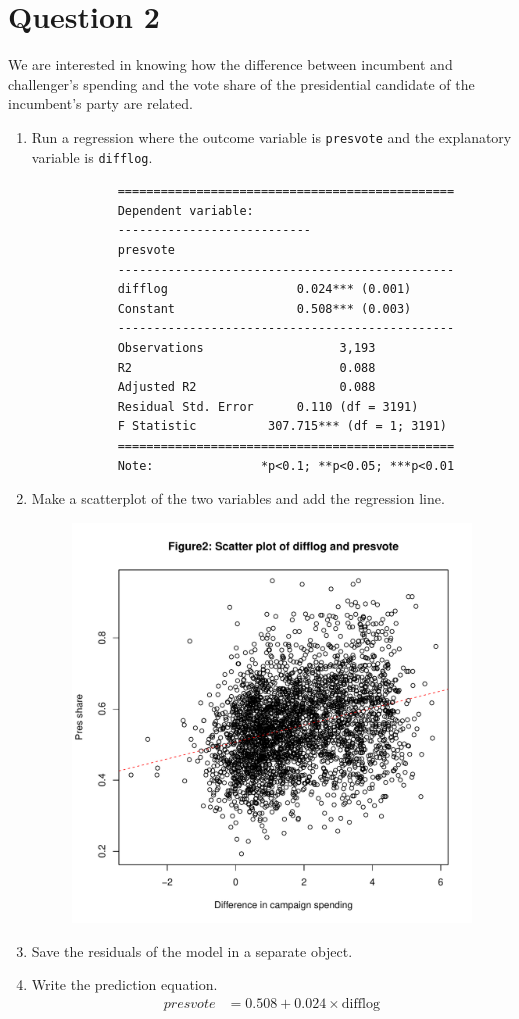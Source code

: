 \documentclass[12pt,letterpaper]{article}
\begin{document}
\section*{Question 2}
\noindent We are interested in knowing how the difference between incumbent and challenger's spending and the vote share of the presidential candidate of the incumbent's party are related.	\vspace{.25cm}
	\begin{enumerate}
		\item Run a regression where the outcome variable is \texttt{presvote} and the explanatory variable is \texttt{difflog}.
		 
		\begin{verbatim}
			===============================================
			Dependent variable:    
			---------------------------
			presvote          
			-----------------------------------------------
			difflog                  0.024*** (0.001)      
			Constant                 0.508*** (0.003)      
			-----------------------------------------------
			Observations                   3,193           
			R2                             0.088           
			Adjusted R2                    0.088           
			Residual Std. Error      0.110 (df = 3191)     
			F Statistic          307.715*** (df = 1; 3191) 
			===============================================
			Note:               *p<0.1; **p<0.05; ***p<0.01
		\end{verbatim} 
		
		\item Make a scatterplot of the two variables and add the regression line.
		 
		\begin{figure}[H]
			\centering
			\includegraphics[width=.55\textwidth]{Q2_2_scatterplot.pdf}
		\end{figure}
		
		\item Save the residuals of the model in a separate object.	
		 
		
		\item Write the prediction equation.
		\begin{align*}
			presvote &= 0.508 + 0.024 \times \text{difflog}
		\end{align*}
	\end{enumerate}
\newpage
		
\end{document}
